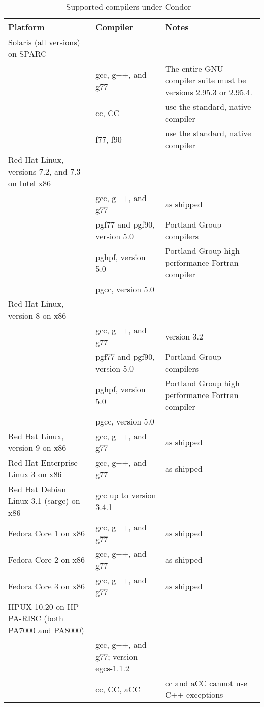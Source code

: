 \begin{center}
\begin{table}[hbt]
\begin{tabular}{|ll|l}
\textbf{Platform} & \textbf{Compiler} & \textbf{Notes}\\ \hline \hline
Solaris (all versions) on SPARC \\ 
& gcc, g++, and g77 & The entire GNU compiler suite must be versions 2.95.3 or 2.95.4. \\ 
& cc, CC & use the standard, native compiler \\ 
& f77, f90 & use the standard, native compiler \\ 
\hline
Red Hat Linux, versions 7.2, and 7.3 on Intel x86 \\ 
& gcc, g++, and g77 & as shipped \\ 
& pgf77 and pgf90, version 5.0 & Portland Group compilers \\ 
& pghpf, version 5.0 & Portland Group high performance Fortran compiler \\ 
& pgcc, version 5.0 \\ 
\hline
Red Hat Linux, version 8 on x86 \\ 
& gcc, g++, and g77 & version 3.2 \\ 
& pgf77 and pgf90, version 5.0 & Portland Group compilers \\ 
& pghpf, version 5.0 & Portland Group high performance Fortran compiler \\ 
& pgcc, version 5.0 \\ 
\hline
Red Hat Linux, version 9 on x86 & gcc, g++, and g77 & as shipped  \\ 
\hline
Red Hat Enterprise Linux 3 on x86 & gcc, g++, and g77 & as shipped  \\ 
\hline
Red Hat Debian Linux 3.1 (sarge) on x86 & gcc up to version 3.4.1 \\ 
\hline
Fedora Core 1 on x86 & gcc, g++, and g77 & as shipped  \\ 
\hline
Fedora Core 2 on x86 & gcc, g++, and g77 & as shipped  \\ 
\hline
Fedora Core 3 on x86 & gcc, g++, and g77 & as shipped  \\ 
\hline
HPUX 10.20 on HP PA-RISC (both PA7000 and PA8000)\\ 
& gcc, g++, and g77; version egcs-1.1.2 \\ 
& cc, CC, aCC & cc and aCC cannot use C++ exceptions \\ 
\hline
\end{tabular}
\caption{\label{supported-compile}Supported compilers under Condor \VersionNotice\ }
\end{table}
\end{center}

